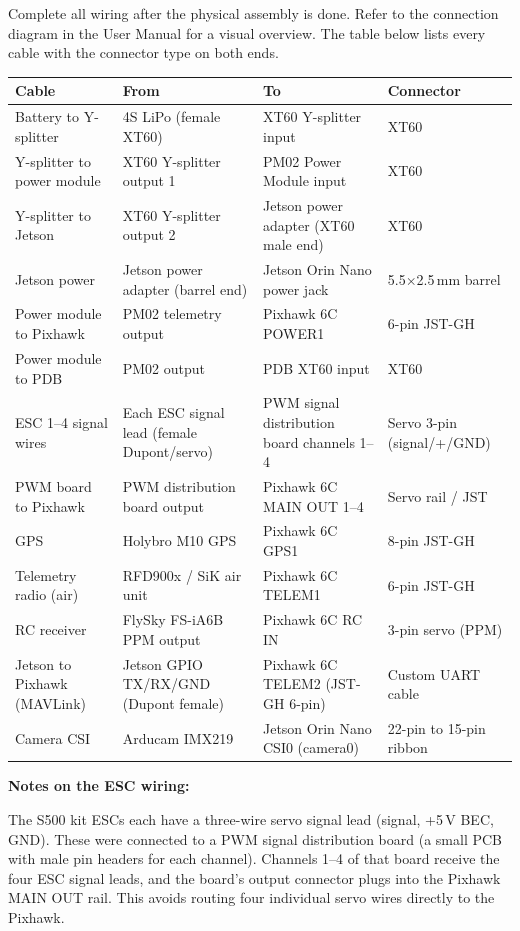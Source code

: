 \documentclass{article}
\begin{document}
Complete all wiring after the physical assembly is done. Refer to the connection diagram in the User Manual for a visual overview. The table below lists every cable with the connector type on both ends.

\begin{longtable}{p{3.5cm}p{3.5cm}p{3.5cm}p{2.5cm}}
\toprule
\textbf{Cable} & \textbf{From} & \textbf{To} & \textbf{Connector} \\
\midrule
\endhead
Battery to Y-splitter & 4S LiPo (female XT60) & XT60 Y-splitter input & XT60 \\
Y-splitter to power module & XT60 Y-splitter output 1 & PM02 Power Module input & XT60 \\
Y-splitter to Jetson & XT60 Y-splitter output 2 & Jetson power adapter (XT60 male end) & XT60 \\
Jetson power & Jetson power adapter (barrel end) & Jetson Orin Nano power jack & 5.5$\times$2.5\,mm barrel \\
Power module to Pixhawk & PM02 telemetry output & Pixhawk 6C POWER1 & 6-pin JST-GH \\
Power module to PDB & PM02 output & PDB XT60 input & XT60 \\
ESC 1--4 signal wires & Each ESC signal lead (female Dupont/servo) & PWM signal distribution board channels 1--4 & Servo 3-pin (signal/+/GND) \\
PWM board to Pixhawk & PWM distribution board output & Pixhawk 6C MAIN OUT 1--4 & Servo rail / JST \\
GPS & Holybro M10 GPS & Pixhawk 6C GPS1 & 8-pin JST-GH \\
Telemetry radio (air) & RFD900x / SiK air unit & Pixhawk 6C TELEM1 & 6-pin JST-GH \\
RC receiver & FlySky FS-iA6B PPM output & Pixhawk 6C RC IN & 3-pin servo (PPM) \\
Jetson to Pixhawk (MAVLink) & Jetson GPIO TX/RX/GND (Dupont female) & Pixhawk 6C TELEM2 (JST-GH 6-pin) & Custom UART cable \\
Camera CSI & Arducam IMX219 & Jetson Orin Nano CSI0 (camera0) & 22-pin to 15-pin ribbon \\
\bottomrule
\end{longtable}

\textbf{Notes on the ESC wiring:}

The S500 kit ESCs each have a three-wire servo signal lead (signal, +5\,V BEC, GND). These were connected to a PWM signal distribution board (a small PCB with male pin headers for each channel). Channels 1--4 of that board receive the four ESC signal leads, and the board's output connector plugs into the Pixhawk MAIN OUT rail. This avoids routing four individual servo wires directly to the Pixhawk.
\end{document}

